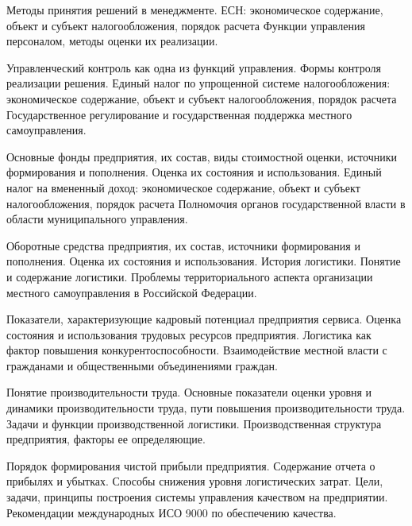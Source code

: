 \documentclass[
	11pt,
	a4paper,
	]
	{article}
\begin{document}
\bigskip

\noindent{} 
	{
		Методы принятия решений в менеджменте.
	}{
		ЕСН: экономическое содержание, объект и субъект налогообложения, порядок расчета
	}{
		Функции управления персоналом, методы оценки их реализации.
	}

\bigskip

\noindent{} 
	{
		Управленческий контроль как одна из функций управления. Формы контроля реализации решения.
	}{
		Единый налог по упрощенной системе налогообложения: экономическое содержание, объект и субъект налогообложения, порядок расчета
	}{
		Государственное регулирование и государственная поддержка местного самоуправления.
	}

\bigskip

\noindent{} 
	{
		Основные фонды предприятия, их состав, виды стоимостной оценки, источники формирования и пополнения. Оценка их состояния и использования.
	}{
		Единый налог на вмененный доход: экономическое содержание, объект и субъект налогообложения, порядок расчета
	}{
		Полномочия органов государственной власти в области муниципального управления.
	}

\bigskip

\noindent{} 
	{
		Оборотные средства предприятия, их состав, источники формирования и пополнения. Оценка их состояния и использования.
	}{
		История логистики. Понятие и содержание логистики.
	}{
		Проблемы территориального аспекта организации местного самоуправления в Российской Федерации.
	}

\bigskip

\noindent{} 
	{
		Показатели, характеризующие кадровый потенциал предприятия сервиса. Оценка состояния и использования трудовых ресурсов предприятия.
	}{
		Логистика как фактор повышения конкурентоспособности.
	}{
		Взаимодействие местной власти с гражданами и общественными объединениями граждан.
	}

\bigskip

\noindent{} 
	{
		Понятие производительности труда. Основные показатели оценки уровня и динамики производительности труда, пути повышения производительности труда.
	}{
		Задачи и функции производственной логистики.
	}{
		Производственная структура предприятия, факторы ее определяющие.
	}

\bigskip

\noindent{} 
	{
		Порядок формирования чистой прибыли предприятия. Содержание отчета о прибылях и убытках.
	}{
		Способы снижения уровня логистических затрат.
	}{
		Цели, задачи, принципы построения системы управления качеством на предприятии. Рекомендации международных ИСО 9000 по обеспечению качества.
	}
\end{document}
